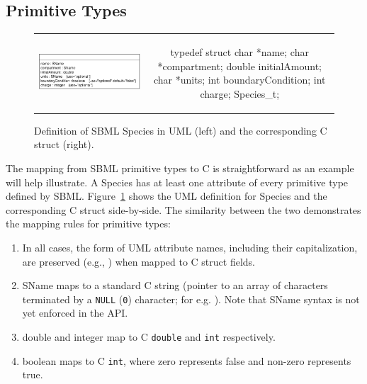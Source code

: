 \documentclass{cekmanual}
\begin{document}
\subsection{Primitive Types}


\begin{figure}[t]
  \begin{tabular}{m{8.5cm}c}
    \includegraphics[scale=0.68]{species}
    &
    \begin{example}[c]
typedef struct
{
  char    *name;
  char    *compartment;
  double  initialAmount;
  char    *units;
  int     boundaryCondition;
  int     charge;
} Species_t;
    \end{example}\\
  \end{tabular}
  \caption{Definition of SBML Species in UML (left) and the
  corresponding  C struct (right).}
  \label{fig:species-uml-and-c}
\end{figure}

The mapping from SBML primitive types to C is straightforward as an
example will help illustrate.  A Species has at least one attribute of
every primitive type defined by SBML.
Figure~\ref{fig:species-uml-and-c} shows the UML definition for
Species and the corresponding C struct side-by-side.  The similarity
between the two demonstrates the mapping rules for primitive types:

\begin{enumerate}
  
  \item In all cases, the form of UML attribute names, including their
  capitalization, are preserved (e.g., ) when
  mapped to C struct fields.

  \item SName maps to a standard C string (pointer to an array of
  characters terminated by a \texttt{NULL} (\texttt{0}) character; for
  e.g. ).  Note that SName syntax is not yet
  enforced in the API.

  \item double and integer map to C \texttt{double} and \texttt{int}
  respectively.

  \item boolean maps to C \texttt{int}, where zero represents false
  and non-zero represents true.

\end{enumerate}
\end{document}
